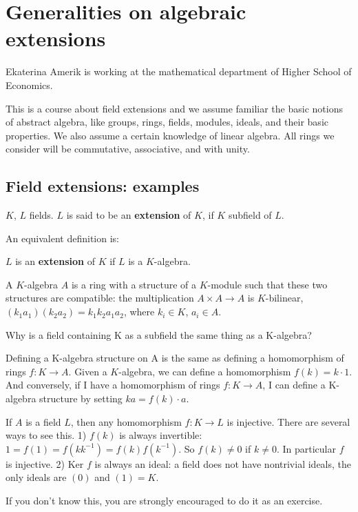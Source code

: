 \chapter{Generalities on algebraic extensions}

Ekaterina Amerik is working at the mathematical department of Higher School of Economics.

This is a course about field extensions and we assume familiar the basic notions of abstract algebra, like groups, rings, fields, modules, ideals, and their basic properties. We also assume a certain knowledge of linear algebra. All rings we consider will be commutative, associative, and with unity. 

\section{Field extensions: examples}

\begin{definition}
$K$, $L$ fields. $L$ is said to be an \textbf{extension} of $K$, if $K$ subfield of $L$.
\end{definition}
An equivalent definition is:
\begin{definition}
$L$ is an \textbf{extension} of $K$ if $L$ is a $K$-algebra. 
\end{definition}

A $K$-algebra $A$ is a ring with a structure of a $K$-module such that these two structures are compatible: the multiplication $A\times A \to A$ is $K$-bilinear, $(k_1 a_1) (k_2 a_2) = k_1 k_2  a_1 a_2$, where $k_i \in K$, $a_i \in A$. 

Why is a field containing K as a subfield the same thing as a K-algebra?

Defining a K-algebra structure on A is the same as defining a homomorphism of rings $f: K \to A$. Given a $K$-algebra, we can define a homomorphism $f(k) = k \cdot 1$. And conversely, if I have a homomorphism of rings $f: K \to A$, I can define a K-algebra structure by setting $ka = f(k) \cdot a$. 

If $A$ is a field $L$, then any homomorphism $f:K \to L$ is injective. There are several ways to see this. 1) $f(k)$ is always invertible: $1 = f(1) = f(kk^{-1}) = f(k) f(k^{-1})$. So $f(k)\neq 0$ if $k \neq 0$. In particular $f$ is injective. 2) $\text{Ker }f$ is always an ideal: a field does not have nontrivial ideals, the only ideals are $(0)$ and $(1)=K$. 

If you don't know this, you are strongly encouraged to do it as an exercise. 

